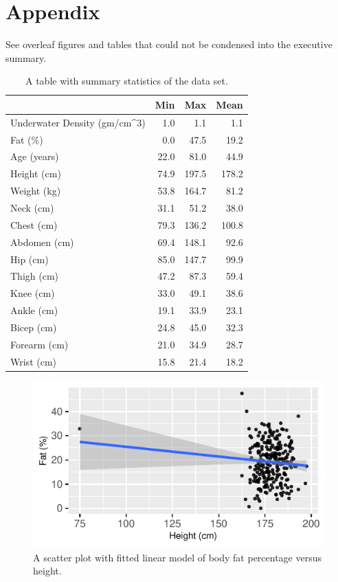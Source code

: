 \documentclass[letterpaper,9pt,twocolumn,twoside,]{pinp}
\begin{document}
\hypertarget{appendix}{%
\section{Appendix}\label{appendix}}

See overleaf figures and tables that could not be condensed into the
executive summary.

\begin{table}

\caption{\label{tab:unnamed-chunk-4}\label{ida:sum} \textnormal{A table with summary statistics of the data set.}}
\centering
\begin{tabular}[t]{l|r|r|r}
\hline
  & Min & Max & Mean\\
\hline
Underwater Density (gm/cm\textasciicircum{}3) & 1.0 & 1.1 & 1.1\\
\hline
Fat (\%) & 0.0 & 47.5 & 19.2\\
\hline
Age (years) & 22.0 & 81.0 & 44.9\\
\hline
Height (cm) & 74.9 & 197.5 & 178.2\\
\hline
Weight (kg) & 53.8 & 164.7 & 81.2\\
\hline
Neck (cm) & 31.1 & 51.2 & 38.0\\
\hline
Chest (cm) & 79.3 & 136.2 & 100.8\\
\hline
Abdomen (cm) & 69.4 & 148.1 & 92.6\\
\hline
Hip (cm) & 85.0 & 147.7 & 99.9\\
\hline
Thigh (cm) & 47.2 & 87.3 & 59.4\\
\hline
Knee (cm) & 33.0 & 49.1 & 38.6\\
\hline
Ankle (cm) & 19.1 & 33.9 & 23.1\\
\hline
Bicep (cm) & 24.8 & 45.0 & 32.3\\
\hline
Forearm (cm) & 21.0 & 34.9 & 28.7\\
\hline
Wrist (cm) & 15.8 & 21.4 & 18.2\\
\hline
\end{tabular}
\end{table}

\begin{figure}

{\centering \includegraphics{template_report_files/figure-latex/linear-height-1} 

}

\caption{\label{lin:h} A scatter plot with fitted linear model of body fat percentage versus height.}\label{fig:linear-height}
\end{figure}
\end{document}
